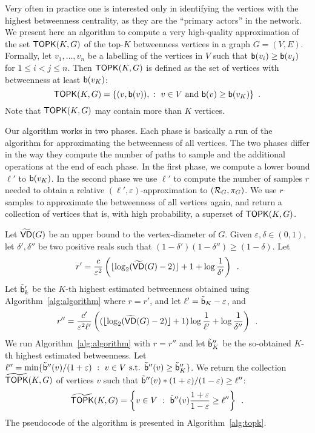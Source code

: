 Very often in practice one is interested only in identifying the vertices with
the highest betweenness centrality, as they are the ``primary actors'' in the
network. We present here an algorithm to compute a very high-quality
approximation of the set $\mathsf{TOPK}(K,G)$ of the top-$K$ betweenness vertices in a graph
$G=(V,E)$. Formally, let $v_1,\dotsc,v_n$ be a labelling of the vertices in $V$
such that $\mathsf{b}(v_i)\ge\mathsf{b}(v_j)$ for $1\le i<j\le n$. Then $\mathsf{TOPK}(K,G)$ is
defined as the set of vertices with betweenness at least $\mathsf{b}(v_K)$:
\[
\mathsf{TOPK}(K,G)=\{(v,\mathsf{b}(v)), ~:~ v\in V \mbox{ and } \mathsf{b}(v)\ge\mathsf{b}(v_K)\}\enspace.
\]
Note that $\mathsf{TOPK}(K,G)$ may contain more than $K$ vertices. 

Our algorithm works in two phases. Each phase is basically a run of the
algorithm for approximating the betweenness of all vertices. %
The two phases differ in the way they compute the number of paths to sample and
the additional operations at the end of each phase. In the first
phase, we compute a lower bound $\ell'$ to $\mathsf{b}(v_K)$. In the second phase we
use $\ell'$ to compute the number of samples $r$ needed to obtain a relative
$(\ell',\varepsilon)$-approximation to $(\mathcal{R}_G,\pi_G)$. We use $r$ samples to approximate the betweenness of all vertices again, and
return a collection of vertices that is, with high probability, a superset of
$\mathsf{TOPK}(K,G)$.

Let $\widetilde{\mathsf{VD}}(G)$ be an upper bound to the vertex-diameter of $G$. Given
$\varepsilon,\delta\in(0,1)$, let $\delta',\delta''$ be two positive reals such
that $(1-\delta')(1-\delta'')\ge(1-\delta)$. Let
\[
r'=\frac{c}{\varepsilon^2}\left(\lfloor\log_2(\widetilde{\mathsf{VD}}(G)-2)\rfloor+1+\log\frac{1}{\delta'}\right)\enspace.
\]
Let $\tilde{\mathsf{b}}'_k$ be the $K$-th highest estimated betweenness obtained using
Algorithm~\ref{alg:algorithm} where $r=r'$, and let
  $\ell'=\tilde{\mathsf{b}}_K-\varepsilon$, %
and
\[
r''=\frac{c'}{\varepsilon^2\ell'}\left((\lfloor\log_2(\widetilde{\mathsf{VD}}(G)-2)\rfloor+1)\log\frac{1}{\ell'}+\log\frac{1}{\delta''}\right)\enspace.
\]
We run Algorithm~\ref{alg:algorithm} with $r=r''$ and let $\tilde{\mathsf{b}}''_K$ be
the so-obtained $K$-th highest estimated betweenness. Let
$\ell''=\min\{\tilde{\mathsf{b}}''(v) / (1+\varepsilon) ~:~ v\in V \mbox{ s.t. }
\tilde{\mathsf{b}}''(v)\ge\tilde{\mathsf{b}}''_K\}$. We
return the collection $\widetilde{\mathsf{TOPK}}(K,G)$ of vertices $v$ such that
$\tilde{\mathsf{b}}''(v)*(1+\varepsilon)/(1-\varepsilon)\ge\ell''$:
\[
\widetilde{\mathsf{TOPK}}(K,G)= \left\{v\in V ~:~
\tilde{\mathsf{b}}''(v)\frac{1+\varepsilon}{1-\varepsilon}\ge\ell''\right\}\enspace.
\]
\ifproof
The pseudocode of the algorithm is presented in Algorithm~\ref{alg:topk}.

